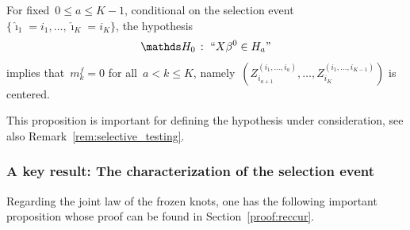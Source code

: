\documentclass[final,numbib]{imaiai}%
\numberwithin{equation}{section}
\def\eq{\begin{equation}}
\def\qe{\end{equation}}
\renewcommand{\hat}{\widehat}
\newcommand{\<}{\langle}
\renewcommand{\>}{\rangle}
\newcommand{\1}{\mathds{1}}
\begin{document}
{\begin{proposition}
\label{prop:H0}
For fixed~$0\leq a\leq K-1$, conditional on the selection event~$\{\hat \imath_1 =i_1, \ldots, \hat \imath_{K}=i_{K}\}$, the hypothesis 
\eq
\notag
\mathds H_0\,:\ \text{‘‘}X\beta^0\in H_{a}\text{''}
\qe
implies that~$m^f_k=0$ for all~$a<k\leq K$, namely~$(Z_{i_{a+1}}^{(i_1,\ldots, i_{a})},\ldots,Z_{i_{K}}^{(i_1,\ldots, i_{K-1})})$ is centered.
\end{proposition}

\noindent
This proposition is important for defining the hypothesis under consideration, see also Remark~\ref{rem:selective_testing}.

\subsubsection{A key result: The characterization of the selection event}
\label{sec:selection_event}
Regarding the joint law of the frozen knots, one has the following important proposition whose proof can be found in Section~\ref{proof:reccur}.

}
\end{document}
